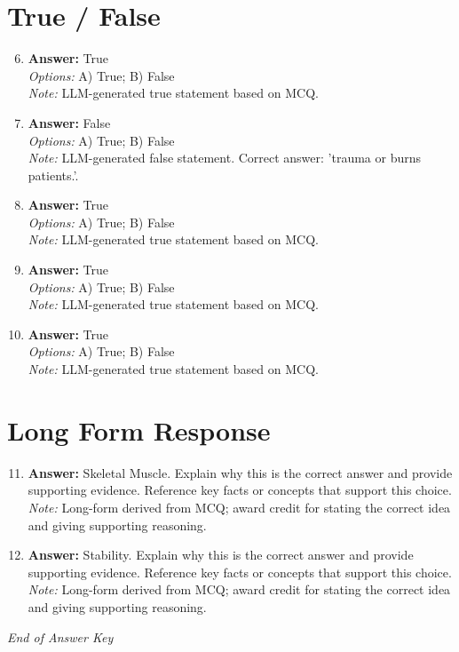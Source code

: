 \documentclass[12pt]{article}
\begin{document}
\section*{True / False}
\begin{enumerate}[label=\arabic*.]
\setcounter{enumi}{5}
\item \textbf{Answer:} True
\\ \textit{Options:} A) True; B) False
\\ \textit{Note:} LLM-generated true statement based on MCQ.
\item \textbf{Answer:} False
\\ \textit{Options:} A) True; B) False
\\ \textit{Note:} LLM-generated false statement. Correct answer: 'trauma or burns patients.'.
\item \textbf{Answer:} True
\\ \textit{Options:} A) True; B) False
\\ \textit{Note:} LLM-generated true statement based on MCQ.
\item \textbf{Answer:} True
\\ \textit{Options:} A) True; B) False
\\ \textit{Note:} LLM-generated true statement based on MCQ.
\item \textbf{Answer:} True
\\ \textit{Options:} A) True; B) False
\\ \textit{Note:} LLM-generated true statement based on MCQ.
\end{enumerate}

\section*{Long Form Response}
\begin{enumerate}[label=\arabic*.]
\setcounter{enumi}{10}
\item \textbf{Answer:} Skeletal Muscle. Explain why this is the correct answer and provide supporting evidence. Reference key facts or concepts that support this choice.
\\ \textit{Note:} Long-form derived from MCQ; award credit for stating the correct idea and giving supporting reasoning.
\item \textbf{Answer:} Stability. Explain why this is the correct answer and provide supporting evidence. Reference key facts or concepts that support this choice.
\\ \textit{Note:} Long-form derived from MCQ; award credit for stating the correct idea and giving supporting reasoning.
\end{enumerate}

\vfill
\noindent\textit{End of Answer Key}
\end{document}
